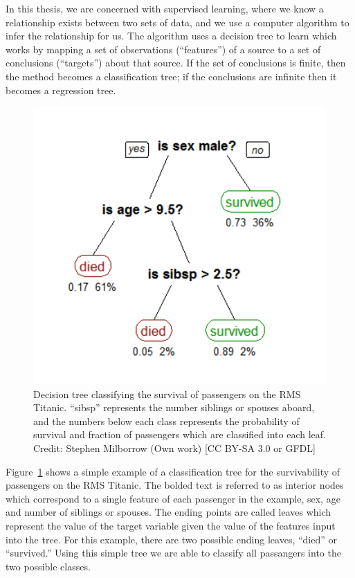 In this thesis, we are concerned with supervised learning, where we know a relationship exists between two sets of data, and we use a computer algorithm to infer the relationship for us. The algorithm uses a decision tree to learn which works by mapping a set of observations (``features'') of a source to a set of conclusions (``targets'') about that source. If the set of conclusions is finite, then the method becomes a classification tree; if the conclusions are infinite then it becomes a regression tree. 

\begin{figure}[!ht]
	\begin{center}
		\includegraphics[height=0.5\textheight]{figures/CART_tree_titanic_survivors.pdf} 
	\end{center}
	\caption[An example of a classification tree.]{Decision tree classifying the survival of passengers on the RMS Titanic. ``sibsp'' represents the number siblings or spouses aboard, and the numbers below each class represents the probability of survival and fraction of passengers which are classified into each leaf. Credit: Stephen Milborrow (Own work) [CC BY-SA 3.0 or GFDL]}
	\label{fig: cart tree} 
\end{figure}

Figure~\ref{fig: cart tree} shows a simple example of a classification tree for the survivability of passengers on the RMS Titanic. The bolded text is referred to as interior nodes which correspond to a single feature of each passenger in the example, sex, age and number of siblings or spouses. The ending points are called leaves which represent the value of the target variable given the value of the features input into the tree. For this example, there are two possible ending leaves, ``died'' or ``survived.'' Using this simple tree we are able to classify all passangers into the two possible classes. 

